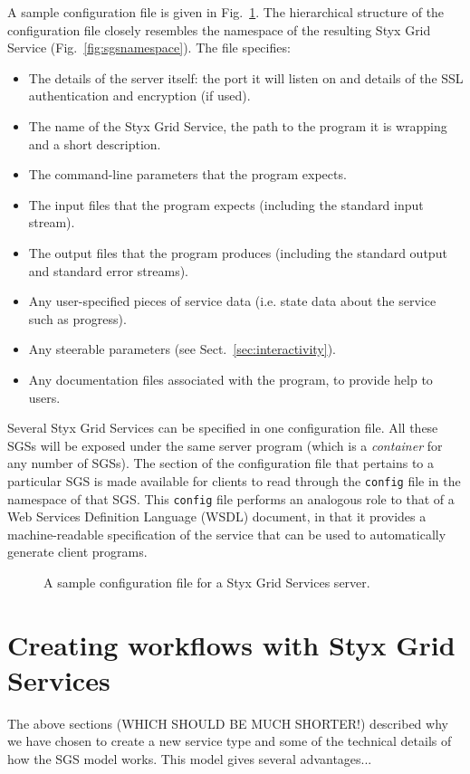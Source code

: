 \documentclass{llncs}
\begin{document}
A sample configuration file is given in Fig.~\ref{fig:configfile}.  The hierarchical structure of the configuration file closely resembles the namespace of the resulting Styx Grid Service (Fig.~\ref{fig:sgsnamespace}).  The file specifies:
\begin{itemize}
	\item The details of the server itself: the port it will listen on and details of the SSL authentication and encryption (if used).
	\item The name of the Styx Grid Service, the path to the program it is wrapping and a short description.
	\item The command-line parameters that the program expects.
	\item The input files that the program expects (including the standard input stream).
	\item The output files that the program produces (including the standard output and standard error streams).
	\item Any user-specified pieces of service data (i.e. state data about the service such as progress).
	\item Any steerable parameters (see Sect.~\ref{sec:interactivity}).
	\item Any documentation files associated with the program, to provide help to users.
\end{itemize}
Several Styx Grid Services can be specified in one configuration file.  All these SGSs will be exposed under the same server program (which is a {\em container\/} for any number of SGSs).  The section of the configuration file that pertains to a particular SGS is made available for clients to read through the {\tt config} file in the namespace of that SGS.  This {\tt config} file performs an analogous role to that of a Web Services Definition Language (WSDL) document, in that it provides a machine-readable specification of the service that can be used to automatically generate client programs.

\begin{figure}
\caption{A sample configuration file for a Styx Grid Services server.}\label{fig:configfile}
\end{figure}
%
\section{Creating workflows with Styx Grid Services}
The above sections (WHICH SHOULD BE MUCH SHORTER!) described why we have chosen to create a new service type and some of the technical details of how the SGS model works.  This model gives several advantages...
\end{document}
